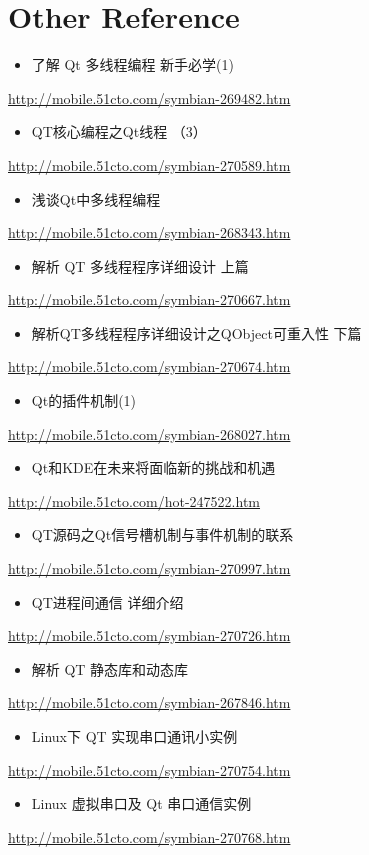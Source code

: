 \documentclass[9pt,b5paper]{article}
\begin{document}
\section{Other Reference}
\label{sec-6}
\begin{itemize}
\item 了解 Qt 多线程编程 新手必学(1)
\end{itemize}
\url{http://mobile.51cto.com/symbian-269482.htm}
\begin{itemize}
\item QT核心编程之Qt线程 （3）
\end{itemize}
\url{http://mobile.51cto.com/symbian-270589.htm}
\begin{itemize}
\item 浅谈Qt中多线程编程
\end{itemize}
\url{http://mobile.51cto.com/symbian-268343.htm}
\begin{itemize}
\item 解析 QT 多线程程序详细设计 上篇
\end{itemize}
\url{http://mobile.51cto.com/symbian-270667.htm}
\begin{itemize}
\item 解析QT多线程程序详细设计之QObject可重入性 下篇
\end{itemize}
\url{http://mobile.51cto.com/symbian-270674.htm}
\begin{itemize}
\item Qt的插件机制(1)
\end{itemize}
\url{http://mobile.51cto.com/symbian-268027.htm}
\begin{itemize}
\item Qt和KDE在未来将面临新的挑战和机遇
\end{itemize}
\url{http://mobile.51cto.com/hot-247522.htm}
\begin{itemize}
\item QT源码之Qt信号槽机制与事件机制的联系
\end{itemize}
\url{http://mobile.51cto.com/symbian-270997.htm}
\begin{itemize}
\item QT进程间通信 详细介绍
\end{itemize}
\url{http://mobile.51cto.com/symbian-270726.htm}
\begin{itemize}
\item 解析 QT 静态库和动态库
\end{itemize}
\url{http://mobile.51cto.com/symbian-267846.htm}
\begin{itemize}
\item Linux下 QT 实现串口通讯小实例
\end{itemize}
\url{http://mobile.51cto.com/symbian-270754.htm}
\begin{itemize}
\item Linux 虚拟串口及 Qt 串口通信实例
\end{itemize}
\url{http://mobile.51cto.com/symbian-270768.htm}
\end{document}
